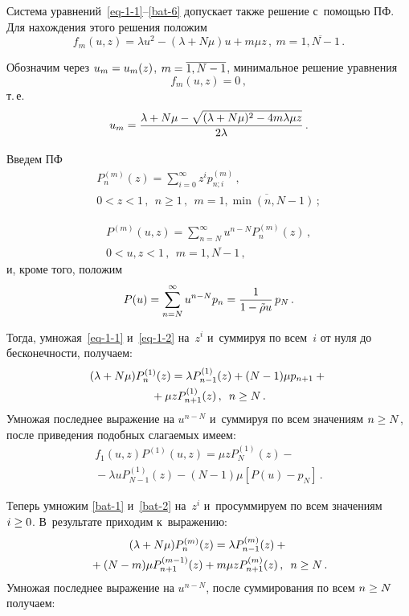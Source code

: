 \begin{multicols}{2}
Система уравнений~\eqref{eq-1-1}--\eqref{bat-6}
допускает также решение с~помощью ПФ.
Для нахождения этого решения положим
\begin{equation*}
\label{f-m}
f_m(u,z) = \lambda u^2 - (\lambda + N\mu) u + m \mu z\,,\
 m=\overline{1,N-1}\,.
\end{equation*}

Обозначим через $u_m\hm=u_m(z)$, $m\hm=\overline{1,N-1}$,
минимальное решение уравнения
$$
f_m(u,z) = 0\,,
$$
т.\,е.
\begin{equation*}
u_m = \displaystyle\frac{\displaystyle \lambda + N\mu - \sqrt{(\lambda + N\mu)^2 - 4 m \lambda \mu z}\mathstrut}{\displaystyle 2 \lambda \mathstrut}\,.
\end{equation*}


Введем ПФ
\begin{multline*}
P^{(m)}_{n}(z) = \sum\limits_{i=0}^{\infty}
z^{i} p^{(m)}_{n;i}\,, \\
0<z<1\,, \ \ n\ge1\,,\ \
m=\overline{1,\min(n,N-1)} \,;
\end{multline*}

\vspace*{-12pt}


\noindent
\begin{multline*}
P^{(m)}(u,z) = \sum\limits_{n=N}^{\infty} u^{n-N} P^{(m)}_{n}(z)\,, \\
0<u,z<1\,, \ \ m=\overline{1,N-1}\,,
\end{multline*}
и, кроме того, положим
$$
P(u) = \sum\limits_{n=N}^{\infty} u^{n-N} p_{n}
= \displaystyle\frac{\displaystyle 1\mathstrut}{\displaystyle 1 - \tilde{\rho} u\mathstrut}\, p_N \,.
$$

Тогда, умножая~\eqref{eq-1-1} и~\eqref{eq-1-2}
на~$z^i$ и~суммируя по всем~$i$ от нуля до
бесконечности, получаем:
\begin{multline*}
(\lambda+N\mu) P^{(1)}_{n}(z) =
\lambda P^{(1)}_{n-1}(z) +
(N-1) \mu p_{n+1}
+ {}\\
{}+\mu z P^{(1)}_{n+1}(z)\,,\enskip n\ge N\,.
\end{multline*}
Умножая последнее выражение на $u^{n-N}$ и~суммируя по всем значениям $n\hm\ge N$,
после приведения подобных слагаемых имеем:
\begin{multline}
\label{eq-z-2}
f_1(u,z) P^{(1)}(u,z) =
\mu z P^{(1)}_{N}(z) -{}\\
{}- \lambda u P^{(1)}_{N-1}(z) -
(N-1) \mu [P(u) - p_{N}] \,.
\end{multline}


Теперь умножим \eqref{bat-1} и~\eqref{bat-2}
на~$z^i$ и~просуммируем по всем значениям $i\hm\ge0$.
В~результате приходим к~выражению:
\begin{multline*}
(\lambda+N\mu) P^{(m)}_{n}(z) = \lambda P^{(m)}_{n-1}(z)
+{}\\
{}+(N-m) \mu P^{(m-1)}_{n+1}(z) +
m \mu z P^{(m)}_{n+1}(z) \,,\enskip n\ge N\,.
\end{multline*}
Умножая последнее выражение на $u^{n-N}$, после
суммирования по всем $n\hm\ge N$ получаем:


\end{multicols}
